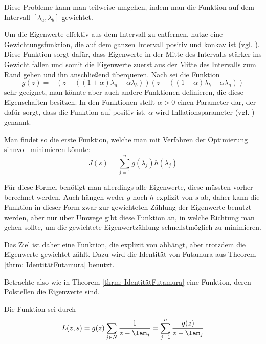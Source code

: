\documentclass[a4paper,12pt]{report}
\newcommand{\1}{\mathds{1}}
\theoremstyle{plain} %
\theoremstyle{definition} %
\theoremstyle{remark}
\begin{document}
            Diese Probleme kann man teilweise umgehen, indem man die Funktion auf dem Intervall $[\lambda_a, \lambda_b]$ gewichtet.

            Um die Eigenwerte effektiv aus dem Intervall zu entfernen, nutze eine Gewichtungsfunktion, die auf dem ganzen Intervall positiv und konkav ist (vgl. \cite[S. 3]{hauptteilTkachuk}).
            Diese Funktion sorgt dafür, dass Eigenwerte in der Mitte des Intervalls stärker ins Gewicht fallen
            und somit die Eigenwerte zuerst aus der Mitte des Intervalls zum Rand gehen und ihn anschließend überqueren.
            Nach \cite[S. 3]{hauptteilTkachuk} sei die Funktion
            $$g(z) = -(z-((1+\alpha)\lambda_a -\alpha\lambda_b))(z-((1+\alpha)\lambda_b-\alpha\lambda_a))$$
            sehr geeignet, man könnte aber auch andere Funktionen definieren, die diese Eigenschaften besitzen.
            In den Funktionen stellt $\alpha>0$ einen Parameter dar, der dafür sorgt, dass die Funktion auf \lamAlamB positiv ist.
            $\alpha$ wird Inflationsparameter (vgl. \cite[S. 3]{hauptteilTkachuk}) genannt.

            Man findet so die erste Funktion, welche man mit Verfahren der Optimierung sinnvoll minimieren könnte:
            \begin{equation}
                  \label{def: J original}
                  J(s) = \sum_{j=1}^n g(\lambda_j)h(\lambda_j)
            \end{equation}

            Für diese Formel benötigt man allerdings alle Eigenwerte, diese müssten vorher berechnet werden.
            Auch hängen weder $g$ noch $h$ explizit von $s$ ab, daher kann die Funktion \J in dieser Form zwar zur gewichteten Zählung der Eigenwerte benutzt werden,
            aber nur über Umwege gibt diese Funktion an, in welche Richtung man gehen sollte, um die gewichtete Eigenwertzählung schnellstmöglich zu minimieren.
            
            Das Ziel ist daher eine Funktion, die explizit von \s abhängt, aber trotzdem die Eigenwerte gewichtet zählt.
            Dazu wird die Identität von Futamura aus Theorem \ref{thrm: IdentitätFutamura} benutzt.

            Betrachte also wie in Theorem \ref{thrm: IdentitätFutamura} eine Funktion, deren Polstellen die Eigenwerte sind.

            Die Funktion sei durch
            \begin{equation}
                  \label{eqn: ZielfunktionMitPolstellen}
                  L(z, s) = g(z)\sum_{j\in N} \frac{1}{z-\lam_j} = \sum_{j=1}^n \frac{g(z)}{z-\lam_j}
            \end{equation}
\end{document}
